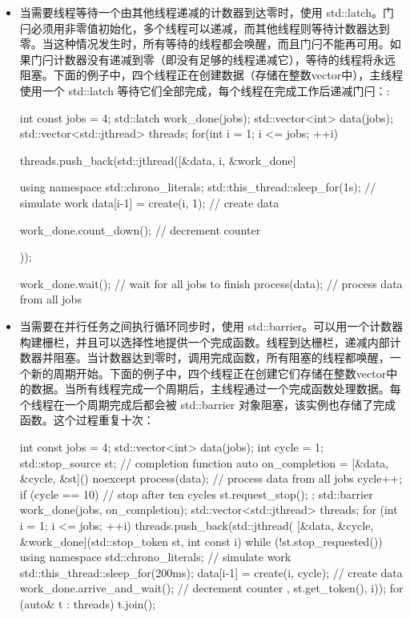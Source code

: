 \begin{itemize}
\item
当需要线程等待一个由其他线程递减的计数器到达零时，使用 std::latch。门闩必须用非零值初始化，多个线程可以递减，而其他线程则等待计数器达到零。当这种情况发生时，所有等待的线程都会唤醒，而且门闩不能再可用。如果门闩计数器没有递减到零（即没有足够的线程递减它），等待的线程将永远阻塞。下面的例子中，四个线程正在创建数据（存储在整数vector中），主线程使用一个 std::latch 等待它们全部完成，每个线程在完成工作后递减门闩：:

\begin{cpp}
int const jobs = 4;
std::latch work_done(jobs);
std::vector<int> data(jobs);
std::vector<std::jthread> threads;
for(int i = 1; i <= jobs; ++i)
{
    threads.push_back(std::jthread([&data, i, &work_done]{
        using namespace std::chrono_literals;
        std::this_thread::sleep_for(1s); // simulate work
        data[i-1] = create(i, 1);        // create data

        work_done.count_down();          // decrement counter
    }));
}
work_done.wait();             // wait for all jobs to finish
process(data);                // process data from all jobs
\end{cpp}

\item
当需要在并行任务之间执行循环同步时，使用 std::barrier。可以用一个计数器构建栅栏，并且可以选择性地提供一个完成函数。线程到达栅栏，递减内部计数器并阻塞。当计数器达到零时，调用完成函数，所有阻塞的线程都唤醒，一个新的周期开始。下面的例子中，四个线程正在创建它们存储在整数vector中的数据。当所有线程完成一个周期后，主线程通过一个完成函数处理数据。每个线程在一个周期完成后都会被 std::barrier 对象阻塞，该实例也存储了完成函数。这个过程重复十次：

\begin{cpp}
int const jobs = 4;
std::vector<int> data(jobs);
int cycle = 1;
std::stop_source st;
// completion function
auto on_completion = [&data, &cycle, &st]() noexcept {
    process(data);          // process data from all jobs
    cycle++;
    if (cycle == 10)        // stop after ten cycles
        st.request_stop();
};
std::barrier work_done(jobs, on_completion);
std::vector<std::jthread> threads;
for (int i = 1; i <= jobs; ++i)
{
    threads.push_back(std::jthread(
        [&data, &cycle, &work_done](std::stop_token st,
                                    int const i)
    {
        while (!st.stop_requested())
        {
            using namespace std::chrono_literals;
            // simulate work
            std::this_thread::sleep_for(200ms);
            data[i-1] = create(i, cycle); // create data
            work_done.arrive_and_wait();  // decrement counter
        }
    },
    st.get_token(),
    i));
}
for (auto& t : threads) t.join();
\end{cpp}


\end{itemize}
